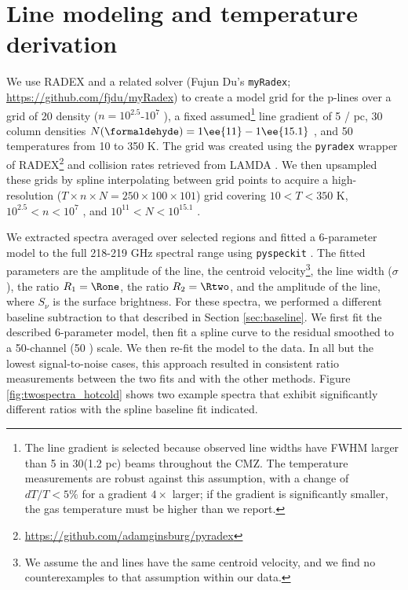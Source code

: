 \section{Line modeling and temperature derivation}
\label{sec:linemodeling}
%
We use RADEX \citep{van-Der-Tak2007a} and a related solver (Fujun Du's
\texttt{myRadex}; \url{https://github.com/fjdu/myRadex}) to create a model grid
for the p-\formaldehyde lines over a grid of 20 density ($n=10^{2.5}$-$10^{7}$
\percc), a fixed assumed\footnote{The line gradient is selected because
observed line widths have FWHM larger than 5 \kms in 30\arcsec (1.2 pc) beams
throughout the CMZ.  The temperature measurements are
robust against this assumption, with a change of $dT/T < 5\%$ for a gradient
$4\times$ larger; if the gradient is significantly smaller, the gas temperature
must be higher than we report.} line gradient of 5 \kms / pc, 30 \formaldehyde
column densities $N(\formaldehyde) = 1\ee{11}-1\ee{15.1}$ \persc, and 50
temperatures from 10 to 350 K.  The grid was created using the \texttt{pyradex}
wrapper of RADEX\footnote{\url{https://github.com/adamginsburg/pyradex}} and
collision rates retrieved from LAMDA \citep{Wiesenfeld2013a}.  We then
upsampled these grids by spline interpolating between grid points to acquire a
high-resolution ($T\times n \times N = 250\times100\times101$) grid covering
$10<T<350$ K, $10^{2.5} < n < 10^7$ \percc, and $10^{11} < N < 10^{15.1}$
\persc\perkmspc.

We extracted spectra averaged over selected regions and fitted
a 6-parameter model to the full 218-219 GHz spectral range using
\texttt{pyspeckit} \citep{Ginsburg2011c}.  The fitted parameters are the
amplitude of the \formaldehyde \threeohthree line, the centroid
velocity\footnote{We assume the \methanol and \formaldehyde lines have the same
centroid velocity, and we find no counterexamples to that assumption within our
data.}, the line width ($\sigma$), the ratio $R_1 = \Rone$, the ratio $R_2 =
\Rtwo$, and the
amplitude of the \methanol \fourtwotwo line, where $S_\nu$ is the surface
brightness.  For these spectra, we performed a different baseline subtraction
to that described in Section
\ref{sec:baseline}.  We first fit the described 6-parameter model, then fit a
spline curve to the residual smoothed to a 50-channel (50 \kms) scale.  We then
re-fit the model to the data.  In all but the lowest signal-to-noise cases,
this approach resulted in consistent ratio measurements between the two fits
and with the other methods.  Figure \ref{fig:twospectra_hotcold} shows two
example spectra that exhibit significantly different ratios with the spline
baseline fit indicated.

